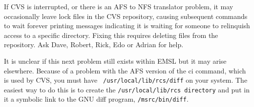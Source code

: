 If CVS is interrupted, or there is an AFS to NFS translator problem,
it may occasionally leave lock files in the CVS repository, causing
subsequent commands to wait forever printing messages indicating it is
waiting for someone to relinquish access to a specific directory.
Fixing this requires deleting files from the repository.  Ask Dave,
Robert, Rick, Edo or Adrian for help.

It is unclear if this next problem still exists within EMSL but it may
arise elsewhere.  Because of a problem with the AFS version of the ci
command, which is used by CVS, you must have {\tt
  /usr/local/lib/rcs/diff} on your system.  The easiest way to do this
is to create the {\tt /usr/local/lib/rcs directory} and put in it a
symbolic link to the GNU diff program, {\tt /msrc/bin/diff}.


